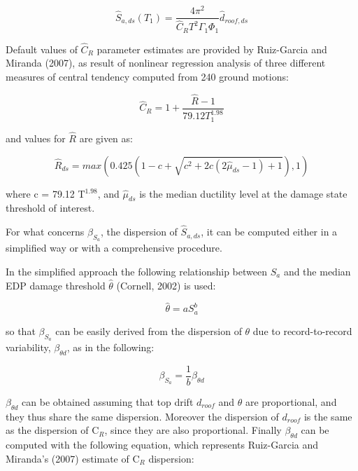 \begin{equation}
\hat{S}_{a,ds}(T_1) = \frac{4 \pi^2}{\hat{C}_R T^2 \Gamma_1 \Phi_1} \hat{d}_{roof, ds}
\label{eq:Sa_RGM}
\end{equation}

Default values of $\hat{C}_R$ parameter estimates are provided by Ruiz-Garcia and Miranda (2007), as result of nonlinear regression analysis of three different measures of central tendency computed from 240 ground motions:

\begin{equation}
\hat{C}_R = 1 + \frac{\hat{R} - 1}{79.12 T_1 ^{1.98}}
\label{eq:Cr_RGM}
\end{equation}

and values for $\hat{R}$ are given as:

\begin{equation}
\hat{R}_{ds} = max(0.425(1 - c + \sqrt{c^2 + 2c(2 \hat{\mu}_{ds} - 1) + 1}),1)
\label{eq:R_RGM}
\end{equation}

where c = 79.12 T$^{1.98}$, and $\hat{\mu}_{ds}$ is the median ductility level at the damage state threshold of interest.

For what concerns $\beta_{S_a}$, the dispersion of $\hat{S}_{a,ds}$, it can be computed either in a simplified way or with a comprehensive procedure.

In the simplified approach the following relationship between $S_a$ and the median EDP damage threshold $\hat{\theta}$ (Cornell, 2002) is used:

\begin{equation}
\hat{\theta} = a S_a^b
\end{equation}

so that $\beta_{S_a}$ can be easily derived from the dispersion of $\theta$ due to record-to-record variability, $\beta_{\theta d}$, as in the following:

\begin{equation}
\beta_{S_a} = \frac{1}{b} \beta_{\theta d}
\label{eq:betaSa_RGM}
\end{equation}

$\beta_{\theta d}$ can be obtained assuming that top drift $d_{roof}$ and $\theta$ are proportional, and they thus share the same dispersion. Moreover the dispersion of $d_{roof}$ is the same as the dispersion of C$_R$, since they are also proportional. Finally $\beta_{\theta d}$ can be computed with the following equation, which represents Ruiz-Garcia and Miranda's (2007) estimate of C$_R$ dispersion:

